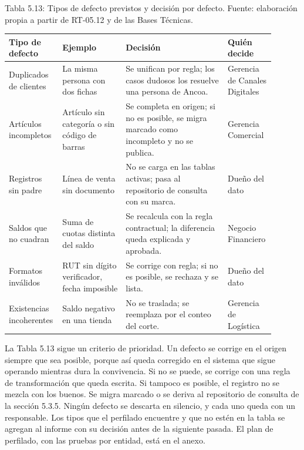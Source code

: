 \documentclass[11pt]{article}
\begin{document}
\par\vspace{0.6\baselineskip}\noindent\begin{minipage}{\linewidth}
Tabla 5.13: Tipos de defecto previstos y decisión por defecto. Fuente: elaboración propia a partir de RT-05.12 y de las Bases Técnicas.\label{tab:t18}\par\vspace{0.3\baselineskip}
\begin{tabular}{@{}p{0.142\linewidth}p{0.235\linewidth}p{0.379\linewidth}p{0.146\linewidth}@{}}
\toprule Tipo de defecto & Ejemplo & Decisión & Quién decide \\
\midrule
Duplicados de clientes & La misma persona con dos fichas & Se unifican por regla; los casos dudosos los resuelve una persona de Ancoa. & Gerencia de Canales Digitales \\
Artículos incompletos & Artículo sin categoría o sin código de barras & Se completa en origen; si no es posible, se migra marcado como incompleto y no se publica. & Gerencia Comercial \\
Registros sin padre & Línea de venta sin documento & No se carga en las tablas activas; pasa al repositorio de consulta con su marca. & Dueño del dato \\
Saldos que no cuadran & Suma de cuotas distinta del saldo & Se recalcula con la regla contractual; la diferencia queda explicada y aprobada. & Negocio Financiero \\
Formatos inválidos & RUT sin dígito verificador, fecha imposible & Se corrige con regla; si no es posible, se rechaza y se lista. & Dueño del dato \\
Existencias incoherentes & Saldo negativo en una tienda & No se traslada; se reemplaza por el conteo del corte. & Gerencia de Logística \\
\bottomrule
\end{tabular}
\end{minipage}
\par


La Tabla 5.13 sigue un criterio de prioridad. Un defecto se corrige en el origen siempre que sea posible, porque así queda corregido en el sistema que sigue operando mientras dura la convivencia. Si no se puede, se corrige con una regla de transformación que queda escrita. Si tampoco es posible, el registro no se mezcla con los buenos. Se migra marcado o se deriva al repositorio de consulta de la sección 5.3.5. Ningún defecto se descarta en silencio, y cada uno queda con un responsable. Los tipos que el perfilado encuentre y que no estén en la tabla se agregan al informe con su decisión antes de la siguiente pasada. El plan de perfilado, con las pruebas por entidad, está en el anexo.
\end{document}
